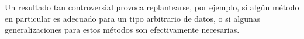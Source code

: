 Un resultado tan controversial provoca replantearse, por ejemplo, si algún método en particular es 
adecuado para un tipo arbitrario de datos, o si algunas generalizaciones para estos métodos son 
efectivamente necesarias.

